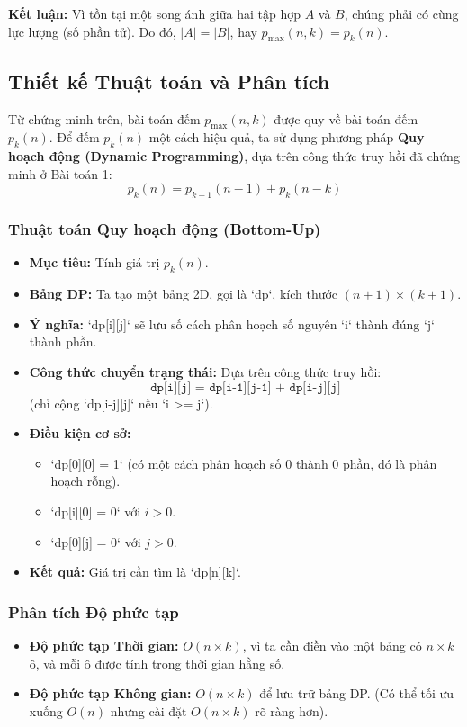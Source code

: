 \documentclass[a4paper,12pt]{article}
\begin{document}
\textbf{Kết luận:} Vì tồn tại một song ánh giữa hai tập hợp $A$ và $B$, chúng phải có cùng lực lượng (số phần tử). Do đó, $|A| = |B|$, hay $p_{\max}(n, k) = p_k(n)$.

\subsection{Thiết kế Thuật toán và Phân tích}
Từ chứng minh trên, bài toán đếm $p_{\max}(n, k)$ được quy về bài toán đếm $p_k(n)$. Để đếm $p_k(n)$ một cách hiệu quả, ta sử dụng phương pháp \textbf{Quy hoạch động (Dynamic Programming)}, dựa trên công thức truy hồi đã chứng minh ở Bài toán 1:
\[ p_k(n) = p_{k-1}(n-1) + p_k(n-k) \]

\subsubsection{Thuật toán Quy hoạch động (Bottom-Up)}
\begin{itemize}
    \item \textbf{Mục tiêu:} Tính giá trị $p_k(n)$.
    \item \textbf{Bảng DP:} Ta tạo một bảng 2D, gọi là `dp`, kích thước $(n+1) \times (k+1)$.
    \item \textbf{Ý nghĩa:} `dp[i][j]` sẽ lưu số cách phân hoạch số nguyên `i` thành đúng `j` thành phần.
    \item \textbf{Công thức chuyển trạng thái:} Dựa trên công thức truy hồi:
    \[ \texttt{dp[i][j] = dp[i-1][j-1] + dp[i-j][j]} \]
    (chỉ cộng `dp[i-j][j]` nếu `i >= j`).
    \item \textbf{Điều kiện cơ sở:}
    \begin{itemize}
        \item `dp[0][0] = 1` (có một cách phân hoạch số 0 thành 0 phần, đó là phân hoạch rỗng).
        \item `dp[i][0] = 0` với $i > 0$.
        \item `dp[0][j] = 0` với $j > 0$.
    \end{itemize}
    \item \textbf{Kết quả:} Giá trị cần tìm là `dp[n][k]`.
\end{itemize}

\subsubsection{Phân tích Độ phức tạp}
\begin{itemize}
    \item \textbf{Độ phức tạp Thời gian:} $O(n \times k)$, vì ta cần điền vào một bảng có $n \times k$ ô, và mỗi ô được tính trong thời gian hằng số.
    \item \textbf{Độ phức tạp Không gian:} $O(n \times k)$ để lưu trữ bảng DP. (Có thể tối ưu xuống $O(n)$ nhưng cài đặt $O(n \times k)$ rõ ràng hơn).
\end{itemize}
\end{document}
